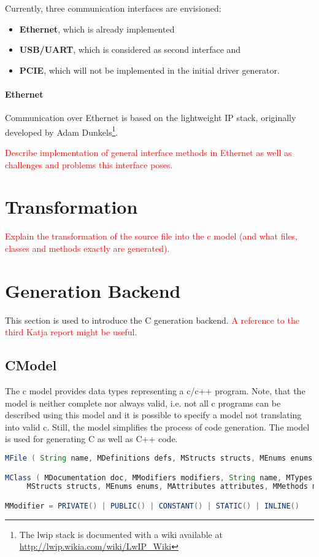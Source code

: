 \documentclass{report}
\begin{document}
Currently, three communication interfaces are envisioned:
\begin{itemize} \itemsep1pt \parskip0pt 
\item \textbf{Ethernet}, which is already implemented
\item \textbf{USB/UART}, which is considered as second interface and
\item \textbf{PCIE}, which will not be implemented in the initial driver generator.
\end{itemize}

\paragraph{Ethernet}
Communication over Ethernet is based on the lightweight IP stack, originally developed by Adam Dunkels\footnote{The lwip stack is documented with a wiki available at \url{http://lwip.wikia.com/wiki/LwIP_Wiki}}.

\textcolor{red}{Describe implementation of general interface methods in Ethernet as well as challenges and problems this interface poses.}

\section{Transformation}
\textcolor{red}{Explain the transformation of the source file into the c model (and what files, classes and methods exactly are generated).}

\section{Generation Backend}
This section is used to introduce the C generation backend. \textcolor{red}{A reference to the third Katja report might be useful.}

\subsection{CModel}
\label{sec:cmodel}
The c model provides data types representing a c/c++ program. Note, that the model is neither complete nor always valid, i.e. not all c programs can be described using this model and it is possible to specify a model not translating into valid c. Still, the model simplifies the process of code generation. The model is used for generating C as well as C++ code.

\begin{lstlisting}[language=java, breaklines=true]
MFile ( String name, MDefinitions defs, MStructs structs, MEnums enums, MAttributes attributes, MMethods methods, MClasses classes )

MClass ( MDocumentation doc, MModifiers modifiers, String name, MTypes extend, 
	 MStructs structs, MEnums enums, MAttributes attributes, MMethods methods, MClasses nested )

MModifier = PRIVATE() | PUBLIC() | CONSTANT() | STATIC() | INLINE()
\end{lstlisting}
\end{document}
